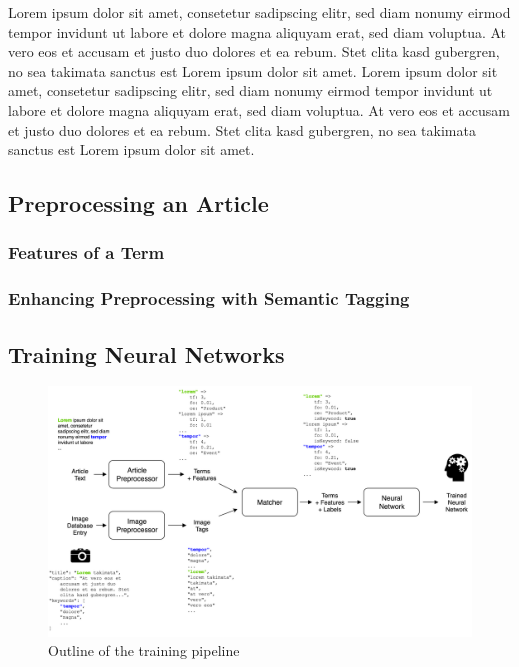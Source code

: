 \documentclass[11pt,a4paper,twoside]{article}
\begin{document}
Lorem ipsum dolor sit amet, consetetur sadipscing elitr, sed diam nonumy eirmod tempor invidunt ut labore et dolore magna aliquyam erat, sed diam voluptua. At vero eos et accusam et justo duo dolores et ea rebum. Stet clita kasd gubergren, no sea takimata sanctus est Lorem ipsum dolor sit amet. Lorem ipsum dolor sit amet, consetetur sadipscing elitr, sed diam nonumy eirmod tempor invidunt ut labore et dolore magna aliquyam erat, sed diam voluptua. At vero eos et accusam et justo duo dolores et ea rebum. Stet clita kasd gubergren, no sea takimata sanctus est Lorem ipsum dolor sit amet.

\subsection{Preprocessing an Article} \label{SystemPreprocess}
\subsubsection{Features of a Term} \label{SystemPreprocessFeatures}
\subsubsection{Enhancing Preprocessing with Semantic Tagging} \label{SystemPreprocessCalais}

\subsection{Training Neural Networks} \label{SystemTrain}

\begin{figure}[t]
  \includegraphics[width=\columnwidth]{picpic-training.png}
  \caption{Outline of the training pipeline}
  \label{fig:picpic-training}
\end{figure}
\end{document}
